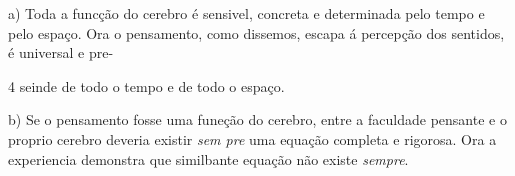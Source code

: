 




 

a) Toda a funcção do cerebro é sensivel, concreta e determinada pelo tempo e pelo espaço. Ora o pensamento, como dissemos, escapa á percepção dos sentidos, é universal e pre-

4 seinde de todo o tempo e de todo o espaço.

b) Se o pensamento fosse uma funeção do cerebro, entre a faculdade pensante e o proprio cerebro deveria existir \emph{sem pre} uma equação completa e rigorosa. Ora a experiencia demonstra que similbante equação não existe \emph{sempre}.

